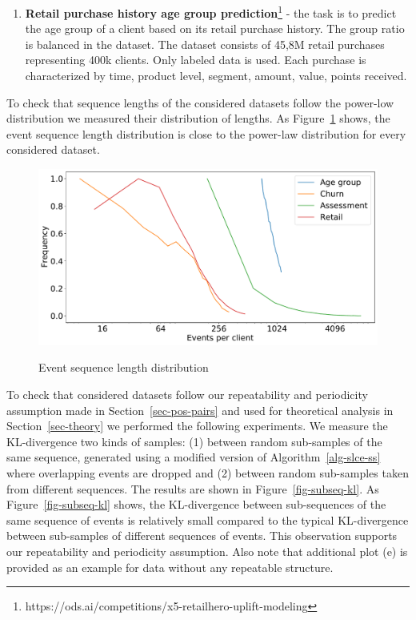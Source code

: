 \documentclass[sigconf]{acmart}
\begin{document}
\begin{enumerate}
    \item \textbf{Retail purchase history age group prediction}\footnote{https://ods.ai/competitions/x5-retailhero-uplift-modeling} - the task is to predict the age group of a client based on its retail purchase history. The group ratio is balanced in the dataset. The dataset consists of 45,8M retail purchases representing 400k clients. Only labeled data is used. Each purchase is characterized by time, product level, segment, amount, value, points received.

\end{enumerate}

To check that sequence lengths of the considered datasets follow the power-low distribution we measured their distribution of lengths. As Figure~\ref{fig-seq-len} shows, the event sequence length distribution is close to the power-law distribution for every considered dataset.

\begin{figure}
  \centering
  \caption{Event sequence length distribution}
  \includegraphics[width=\linewidth]{figures/all_scenario_events_per_client.pdf}
  \label{fig-seq-len}
\end{figure}

To check that considered datasets follow our repeatability and periodicity assumption made in Section~\ref{sec-pos-pairs} and used for theoretical analysis in Section~\ref{sec-theory} we performed the following experiments. We measure the KL-divergence two kinds of samples: (1) between random sub-samples of the same sequence, generated using a modified version of Algorithm~\ref{alg-slce-ss} where overlapping events are dropped and (2) between random sub-samples taken from different sequences. The results are shown in Figure~\ref{fig-subseq-kl}. As Figure~\ref{fig-subseq-kl} shows, the KL-divergence between sub-sequences of the same sequence of events is relatively small compared to the typical KL-divergence between sub-samples of different sequences of events. This observation supports our repeatability and periodicity assumption.
Also note that additional plot (e) is provided as an example for data without any repeatable structure.
\end{document}
